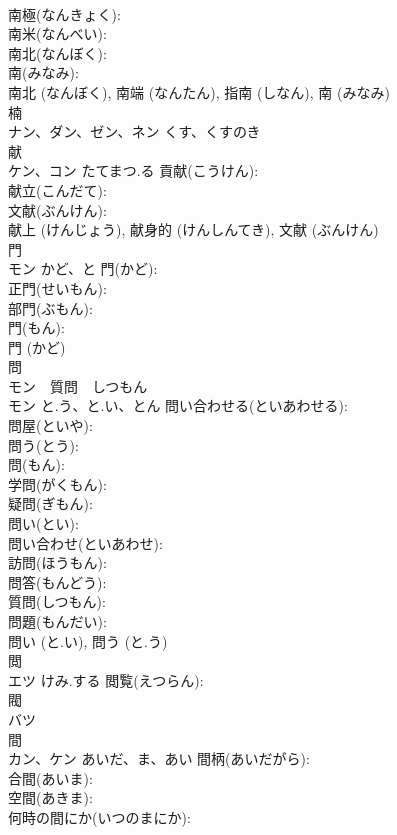 \documentclass[8pt]{extreport}
\begin{document}
\begin{CJK}{UTF8}{min}
\\	南極(なんきょく): 
\\	南米(なんべい): 
\\	南北(なんぼく): 
\\	南(みなみ): 
\\	南北 (なんぼく), 南端 (なんたん), 指南 (しなん), 南 (みなみ)
\\	楠			
\\	ナン、ダン、ゼン、ネン	くす、くすのき		
\\	献			
\\	ケン、コン	たてまつ.る	貢献(こうけん): 
\\	献立(こんだて): 
\\	文献(ぶんけん): 
\\	献上 (けんじょう), 献身的 (けんしんてき), 文献 (ぶんけん)
\\	門			
\\	モン	かど、と	門(かど): 
\\	正門(せいもん): 
\\	部門(ぶもん): 
\\	門(もん): 
\\	門 (かど)
\\	問			
\\	モン　質問　しつもん
\\	モン	と.う、と.い、とん	問い合わせる(といあわせる): 
\\	問屋(といや): 
\\	問う(とう): 
\\	問(もん): 
\\	学問(がくもん): 
\\	疑問(ぎもん): 
\\	問い(とい): 
\\	問い合わせ(といあわせ): 
\\	訪問(ほうもん): 
\\	問答(もんどう): 
\\	質問(しつもん): 
\\	問題(もんだい): 
\\	問い (と.い), 問う (と.う)
\\	閲			
\\	エツ	けみ.する	閲覧(えつらん): 
\\	閥			
\\	バツ			
\\	間			
\\	カン、ケン	あいだ、ま、あい	間柄(あいだがら): 
\\	合間(あいま): 
\\	空間(あきま): 
\\	何時の間にか(いつのまにか): 

\end{CJK}
\end{document}
